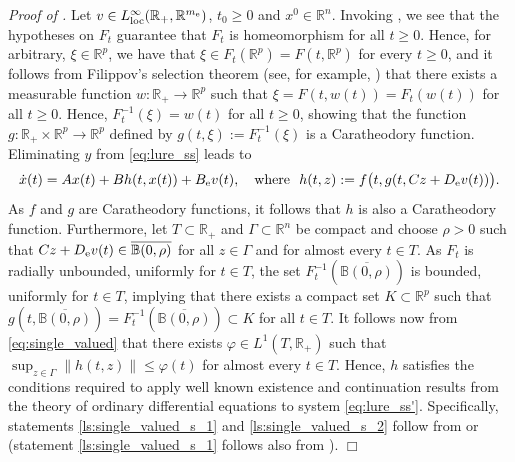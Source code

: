 \documentclass[a4paper,11pt]{article}
\newcommand{\B}{\mathbb B}
\newcommand{\R}{\mathbb R}
\numberwithin{equation}{section}
\numberwithin{figure}{section}
\numberwithin{table}{section}
\begin{document}
{\it Proof of .} Let $v\in L^\infty_{\rm loc}(\R_+,\R^{m_{\rm e}})$, $t_0\geq 0$ and $x^0\in\R^n$. Invoking , we see that the hypotheses on $F_t$ guarantee that $F_t$ is homeomorphism for all $t\geq 0$. Hence, for arbitrary, $\xi\in\R^p$,
we have that $\xi\in F_t(\R^p)=F(t,\R^p)$ for every $t\geq 0$, and it follows from Filippov's selection theorem (see, for example, \cite[Theorem 2.3.13]{v00})
that there exists a measurable function $w:\R_+\to\R^p$ such that $\xi=F(t,w(t))=F_t(w(t))$ for all $t\geq 0$. Hence, $F_t^{-1}(\xi)=w(t)$ for all $t\geq 0$, showing that the function $g:\R_+\times\R^p\to\R^p$ defined by $g(t,\xi):=F_t^{-1}(\xi)$ is a Caratheodory function. Eliminating $y$ from \eqref{eq:lure_ss} leads to
\begin{equation}\label{eq:lure_ss'}
\dot x(t)=Ax(t)+Bh(t,x(t))+B_{\rm e}v(t),\quad\mbox{where \,\,$h(t,z):=f\big(t,g(t,Cz+D_{\rm e}v(t))\big)$}.
\end{equation}
As $f$ and $g$ are Caratheodory functions, it follows that $h$ is also a Caratheodory function.
Furthermore, let $T\subset\R_+$ and $\Gamma\subset\R^n$ be compact and choose $\rho>0$ such that $Cz+D_{\rm e}v(t)\in\overline{\B(0,\rho)}$ for all $z\in\Gamma$ and for almost every $t\in T$. As $F_t$
is radially unbounded, uniformly for $t\in T$, the set $F_t^{-1}(\overline{\B(0,\rho)})$
is bounded, uniformly for $t\in T$, implying that there exists a compact set $K\subset\R^p$ such that
$g(t,\overline{\B(0,\rho)})=F_t^{-1}(\overline{\B(0,\rho)})\subset K$ for all $t\in T$. It follows now from \eqref{eq:single_valued} that there exists $\varphi\in L^1(T,\R_+)$ such that $\sup_{z\in\Gamma}\|h(t,z)\|\leq\varphi(t)$ for almost every $t\in T$. Hence, $h$ satisfies
the conditions required to apply well known existence and continuation results from the theory of ordinary differential equations to system \eqref{eq:lure_ss'}. Specifically,
statements \ref{ls:single_valued_s_1} and \ref{ls:single_valued_s_2}
follow from \cite[Chapter 2, Sec.\,1]{cl55} or \cite[Chapter III, \S 10, Supp.\,II]{w98}
(statement \ref{ls:single_valued_s_1} follows also from \cite[Section 7.4]{v04}).
\hfill$\Box$
\end{document}
